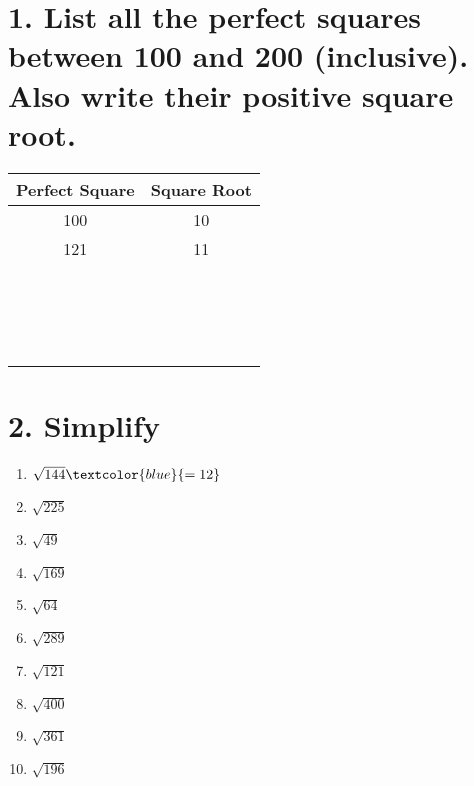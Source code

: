 \documentclass{hw}
\begin{document}
\section*{\normalsize 1. List all the perfect squares between 100 and 200 (inclusive). Also write their positive square root.}
\renewcommand{\arraystretch}{2} %
\begin{center}
\begin{tabular}{|c|c|}
    \hline
    Perfect Square & Square Root \\
    \hline
    100 & 10 \\
    \hline
    121 & 11 \\
    \hline
    & \\
    \hline
    & \\
    \hline
    & \\
    \hline
    & \\
    \hline
    & \\
    \hline
    & \\
    \hline
    & \\
    \hline
    & \\
    \hline
    & \\
    \hline
    & \\
    \hline
    & \\
    \hline
    & \\
    \hline
    & \\
    \hline
    & \\
    \hline
    & \\
    \hline
    & \\
    \hline
    & \\
    \hline
\end{tabular}
\end{center}

\section*{\normalsize 2. Simplify}
\begin{enumerate}[label=\alph*.]
    \item $\sqrt{144} \textcolor{blue}{= 12}$
        \studentsmallworkspace
    \item $\sqrt{225}$
        \studentsmallworkspace
    \item $\sqrt{49}$
        \studentsmallworkspace
    \item $\sqrt{169}$
        \studentsmallworkspace
    \item $\sqrt{64}$
        \studentsmallworkspace
    \item $\sqrt{289}$
        \studentsmallworkspace
    \item $\sqrt{121}$
        \studentsmallworkspace
    \item $\sqrt{400}$
        \studentsmallworkspace
    \item $\sqrt{361}$
        \studentsmallworkspace
    \item $\sqrt{196}$
        \studentsmallworkspace
\end{enumerate}
\end{document}
